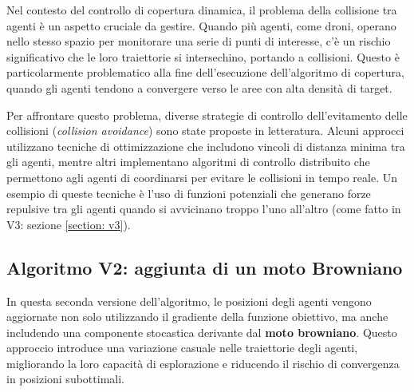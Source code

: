 \documentclass[twoside]{article}
\begin{document}
Nel contesto del controllo di copertura dinamica, il problema della collisione tra agenti è un aspetto cruciale da gestire. Quando più agenti, come droni, operano nello stesso spazio per monitorare una serie di punti di interesse, c'è un rischio significativo che le loro traiettorie si intersechino, portando a collisioni. Questo è particolarmente problematico alla fine dell'esecuzione dell'algoritmo di copertura, quando gli agenti tendono a convergere verso le aree con alta densità di target.

Per affrontare questo problema, diverse strategie di controllo dell'evitamento delle collisioni (\textit{collision avoidance}) sono state proposte in letteratura. Alcuni approcci utilizzano tecniche di ottimizzazione che includono vincoli di distanza minima tra gli agenti, mentre altri implementano algoritmi di controllo distribuito che permettono agli agenti di coordinarsi per evitare le collisioni in tempo reale. Un esempio di queste tecniche è l'uso di funzioni potenziali che generano forze repulsive tra gli agenti quando si avvicinano troppo l'uno all'altro \cite{collisionAvoidance} (come fatto in V3: sezione \ref{section: v3}). 



\subsection{Algoritmo V2: aggiunta di un moto Browniano}\label{section: v2}

In questa seconda versione dell'algoritmo, le posizioni degli agenti vengono aggiornate non solo utilizzando il gradiente della funzione obiettivo, ma anche includendo una componente stocastica derivante dal \textbf{moto browniano}. Questo approccio introduce una variazione casuale nelle traiettorie degli agenti, migliorando la loro capacità di esplorazione e riducendo il rischio di convergenza in posizioni subottimali.

\vspace{\baselineskip}
\begin{algorithm}[H]
\SetAlgoLined
{}
\caption{V2: Algoritmo di coverage dinamico, aggiunta moto di Browniano}
\end{algorithm}
\vspace{\baselineskip}
\end{document}
